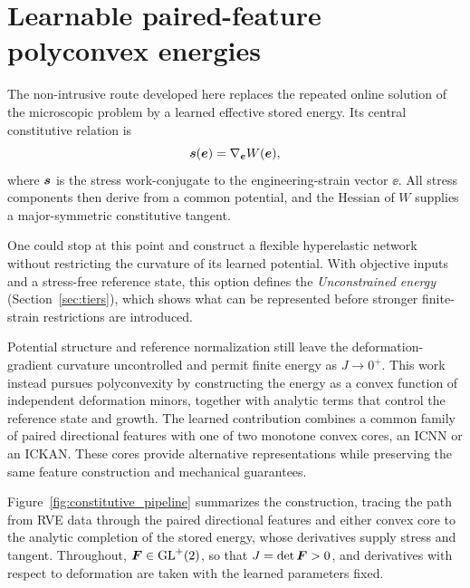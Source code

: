 \section{Learnable paired-feature polyconvex energies}
\label{sec:learned}
The non-intrusive route developed here replaces the repeated online solution of the microscopic problem by a learned effective stored energy. Its central constitutive relation is
\begin{equation}
 \bm s(\bm e)=\nabla_{\bm e}W(\bm e),
 \label{eq:energy_stress_relation}
\end{equation}
where $\bm s$ is the stress work-conjugate to the engineering-strain vector $\ee$. All stress components then derive from a common potential, and the Hessian of $W$ supplies a major-symmetric constitutive tangent.

One could stop at this point and construct a flexible hyperelastic network without restricting the curvature of its learned potential. With objective inputs and a stress-free reference state, this option defines the \emph{Unconstrained energy} (Section~\ref{sec:tiers}), which shows what can be represented before stronger finite-strain restrictions are introduced.

Potential structure and reference normalization still leave the deformation-gradient curvature uncontrolled and permit finite energy as $J\to0^+$. This work instead pursues polyconvexity by constructing the energy as a convex function of independent deformation minors, together with analytic terms that control the reference state and growth. The learned contribution combines a common family of paired directional features with one of two monotone convex cores, an ICNN or an ICKAN. These cores provide alternative representations while preserving the same feature construction and mechanical guarantees.

Figure~\ref{fig:constitutive_pipeline} summarizes the construction, tracing the path from RVE data through the paired directional features and either convex core to the analytic completion of the stored energy, whose derivatives supply stress and tangent. Throughout, $\bm F\in\mathrm{GL}^{+}(2)$, so that $J=\det\bm F>0$, and derivatives with respect to deformation are taken with the learned parameters fixed.


